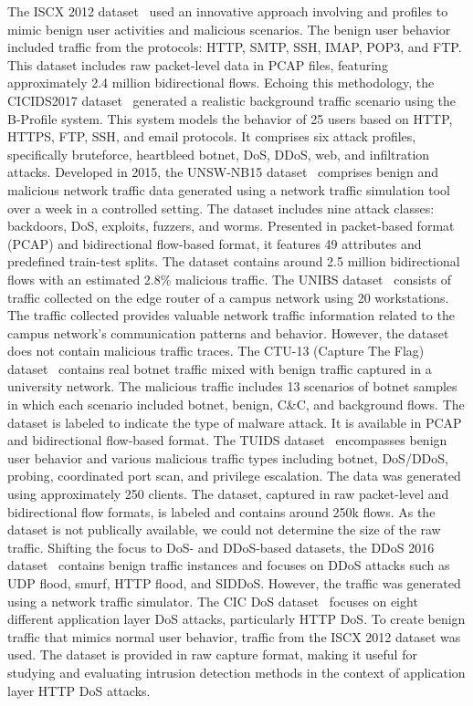 \documentclass[lettersize,journal]{IEEEtran}
\begin{document}
The ISCX 2012 dataset~\cite{shiravi12iscx} used an innovative approach involving  and  profiles to mimic benign user activities and malicious scenarios. The benign user behavior included traffic from the protocols: \ac{HTTP}, \ac{SMTP}, \ac{SSH}, \ac{IMAP}, \ac{POP3}, and \ac{FTP}. This dataset includes raw packet-level data in \ac{PCAP} files, featuring approximately 2.4 million bidirectional flows. Echoing this methodology, the CICIDS2017 dataset~\cite{sharafaldin2018CICIDS} generated a realistic background traffic scenario using the B-Profile system. This system models the behavior of 25 users based on \ac{HTTP}, \ac{HTTPS}, \ac{FTP}, \ac{SSH}, and email protocols. It comprises six attack profiles, specifically bruteforce, heartbleed botnet, \ac{DoS}, \ac{DDoS}, web, and infiltration attacks. Developed in 2015, the UNSW-NB15 dataset~\cite{moustafa15UNSW} comprises benign and malicious network traffic data generated using a network traffic simulation tool over a week in a controlled setting. The dataset includes nine attack classes: backdoors, \ac{DoS}, exploits, fuzzers, and worms. Presented in packet-based format (\ac{PCAP}) and bidirectional flow-based format, it features 49 attributes and predefined train-test splits. The dataset contains around 2.5 million bidirectional flows with an estimated 2.8\% malicious traffic. The UNIBS dataset~\cite{gringoli2009UNIBS} consists of traffic collected on the edge router of a campus network using 20 workstations. The traffic collected provides valuable network traffic information related to the campus network's communication patterns and behavior. However, the dataset does not contain malicious traffic traces. The CTU-13 (Capture The Flag) dataset~\cite{garcia2014CTU} contains real botnet traffic mixed with benign traffic captured in a university network. The malicious traffic includes 13 scenarios of botnet samples in which each scenario included botnet, benign, C\&C, and background flows. The dataset is labeled to indicate the type of malware attack. It is available in \ac{PCAP} and bidirectional flow-based format. The TUIDS dataset~\cite{bhuyan2015TUIDS} encompasses benign user behavior and various malicious traffic types including botnet, \ac{DoS}/\ac{DDoS}, probing, coordinated port scan, and privilege escalation. The data was generated using approximately 250 clients. The dataset, captured in raw packet-level and bidirectional flow formats, is labeled and contains around 250k flows. As the dataset is not publically available, we could not determine the size of the raw traffic. Shifting the focus to \ac{DoS}- and \ac{DDoS}-based datasets, the \ac{DDoS} 2016 dataset~\cite{alkasassbeh2016DDoS} contains benign traffic instances and focuses on \ac{DDoS} attacks such as \ac{UDP} flood, smurf, \ac{HTTP} flood, and \ac{SIDDoS}. However, the traffic was generated using a network traffic simulator. The CIC DoS dataset~\cite{jazi2017CICDoS} focuses on eight different application layer \ac{DoS} attacks, particularly HTTP \ac{DoS}. To create benign traffic that mimics normal user behavior, traffic from the ISCX 2012 dataset was used. The dataset is provided in raw capture format, making it useful for studying and evaluating intrusion detection methods in the context of application layer HTTP \ac{DoS} attacks.
\end{document}
